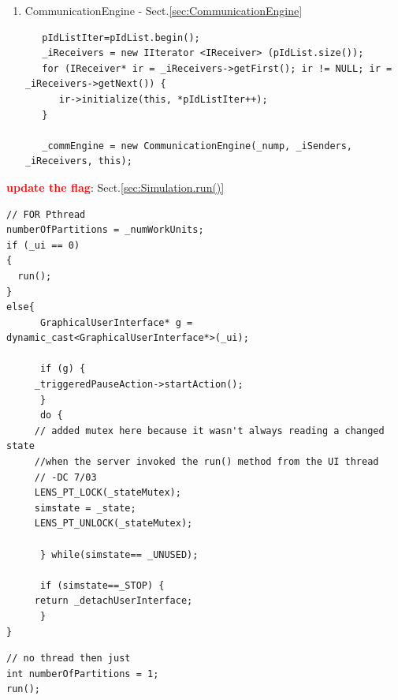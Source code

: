 \begin{enumerate}
  \item CommunicationEngine - Sect.\ref{sec:CommunicationEngine}
  
\begin{verbatim}
   pIdListIter=pIdList.begin();
   _iReceivers = new IIterator <IReceiver> (pIdList.size());
   for (IReceiver* ir = _iReceivers->getFirst(); ir != NULL; ir = _iReceivers->getNext()) {
      ir->initialize(this, *pIdListIter++);
   }

   _commEngine = new CommunicationEngine(_nump, _iSenders, _iReceivers, this);
\end{verbatim}
\end{enumerate}

\textcolor{red}{\bf update the flag}: Sect.\ref{sec:Simulation.run()} 
\begin{verbatim}
// FOR Pthread
numberOfPartitions = _numWorkUnits;
if (_ui == 0) 
{
  run();
}
else{
      GraphicalUserInterface* g = dynamic_cast<GraphicalUserInterface*>(_ui);

      if (g) {
	 _triggeredPauseAction->startAction();
      }
      do {
	 // added mutex here because it wasn't always reading a changed state
	 //when the server invoked the run() method from the UI thread
	 // -DC 7/03
	 LENS_PT_LOCK(_stateMutex);
	 simstate = _state;
	 LENS_PT_UNLOCK(_stateMutex);
	 
      } while(simstate== _UNUSED);
      
      if (simstate==_STOP) {
	 return _detachUserInterface;
      }
}
\end{verbatim}

\begin{verbatim}
// no thread then just 
int numberOfPartitions = 1;
run();
\end{verbatim}

